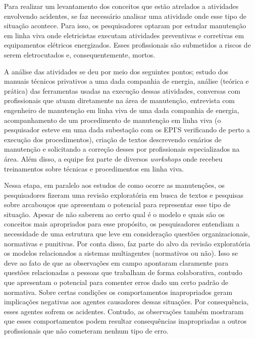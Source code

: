 Para realizar um levantamento dos conceitos que estão atrelados a atividades envolvendo acidentes, se faz necessário analisar uma atividade onde esse tipo de situação acontece. Para isso, os pesquisadores optaram por estudar manutenção em linha viva onde eletricistas executam atividades preventivas e corretivas em equipamentos elétricos energizados. Esses profissionais são submetidos a riscos de serem eletrocutados e, consequentemente, mortos. 

A análise das atividades se deu por meio dos seguintes pontos; estudo dos manuais técnicos privativos a uma dada companhia de energia, análise (teórica e prática) das ferramentas usadas na execução dessas atividades, conversas com profissionais que atuam diretamente na área de manutenção, entrevista com engenheiro de manutenção em linha viva de uma dada companhia de energia, acompanhamento de um procedimento de manutenção em linha viva (o pesquisador esteve em uma dada subestação com os EPI'S verificando de perto a execução dos procedimentos), criação de textos descrevendo cenários de manutenção e solicitando a correção desses por profissionais especializados na área. Além disso, a equipe fez parte de diversos \textit{workshops} onde recebeu treinamentos sobre técnicas e procedimentos em linha viva. 

Nessa etapa, em paralelo aos estudos de como ocorre as manutenções, os pesquisadores fizeram uma revisão exploratória em busca de textos e pesquisas sobre arcabouços que apresentam o potencial para representar esse tipo de situação. Apesar de não saberem ao certo qual é o modelo e quais são os conceitos mais apropriados para esse propósito, os pesquisadores entendiam a necessidade de uma estrutura que leve em consideração questões organizacionais, normativas e punitivas. Por conta disso, faz parte do alvo da revisão exploratória os modelos relacionados a sistemas multiagentes (normativos ou não). Isso se deve ao fato de que as observações em campo apontaram claramente para questões relacionadas a pessoas que trabalham de forma colaborativa, contudo que apresentam o potencial para comenter erros dado um certo padrão de normativa. Sobre certas condições os comportamentos inapropriados geram implicações negativas aos agentes causadores dessas situações. Por consequência, esses agentes sofrem os acidentes. Contudo, as observações também mostraram que esses comportamentos podem resultar consequências inapropriadas a outros profissionais que não cometeram nenhum tipo de erro.